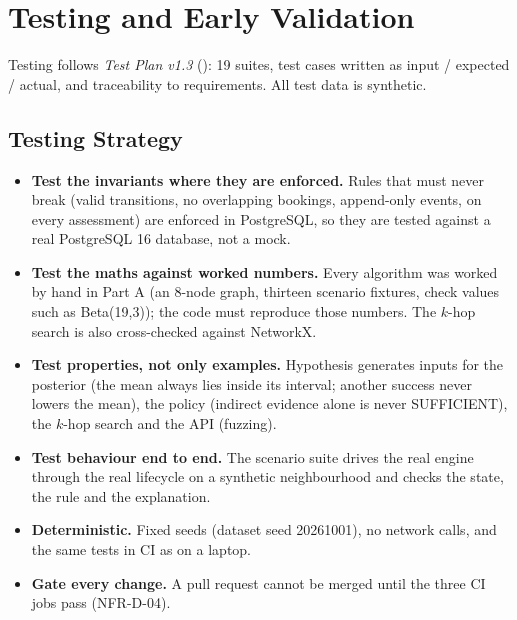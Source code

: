\chapter{Testing and Early Validation}\label{ch:testing-early-validation}
Testing follows \textit{Test Plan v1.3} (): 19 suites, test cases written as input / expected / actual, and traceability to requirements. All test data is synthetic.

\section{Testing Strategy}\label{sec:testing-strategy}
\begin{itemize}
\item \textbf{Test the invariants where they are enforced.} Rules that must never break (valid transitions, no overlapping bookings, append-only events,  on every assessment) are enforced in PostgreSQL, so they are tested against a real PostgreSQL 16 database, not a mock.
\item \textbf{Test the maths against worked numbers.} Every algorithm was worked by hand in Part A (an 8-node graph, thirteen scenario fixtures, check values such as Beta(19,3)); the code must reproduce those numbers. The $k$-hop search is also cross-checked against NetworkX.
\item \textbf{Test properties, not only examples.} Hypothesis generates inputs for the posterior (the mean always lies inside its interval; another success never lowers the mean), the policy (indirect evidence alone is never SUFFICIENT), the $k$-hop search and the API (fuzzing).
\item \textbf{Test behaviour end to end.} The scenario suite drives the real engine through the real lifecycle on a synthetic neighbourhood and checks the state, the rule and the explanation.
\item \textbf{Deterministic.} Fixed seeds (dataset seed 20261001), no network calls, and the same tests in CI as on a laptop.
\item \textbf{Gate every change.} A pull request cannot be merged until the three CI jobs pass (NFR-D-04).
\end{itemize}

